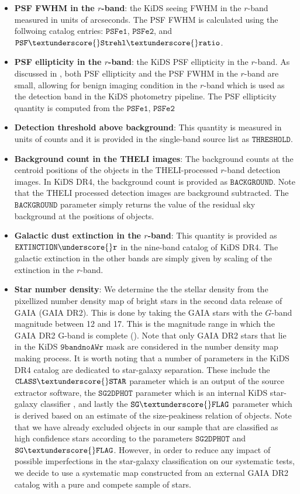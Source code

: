 \documentclass[fleqn,usenatbib,useAMS]{mnras}
\begin{document}
\begin{itemize}
  \item \textbf{PSF FWHM in the $r$-band}: the KiDS seeing FWHM in the $r$-band measured in units of arcseconds. The PSF FWHM is calculated using the follwoing catalog entries: $\mathtt{PSFe1}$, $\mathtt{PSFe2}$, and $\mathtt{PSF \textunderscore{} Strehl \textunderscore{} ratio}$.
    \item \textbf{PSF ellipticity in the $r$-band}: the KiDS PSF ellipticity in the $r$-band. As discussed in \citet{kuijken2019}, both PSF ellipticity and the PSF FWHM in the $r$-band are small, allowing for benign imaging condition in the $r$-band which is used as the detection band in the KiDS photometry pipeline. 
    The PSF ellipticity quantity is computed from the $\mathtt{PSFe1}$, $\mathtt{PSFe2}$
  \item \textbf{Detection threshold above background}: This quantity is measured in units of counts and it is provided in the single-band source list as $\mathtt{THRESHOLD}$. 
  \item \textbf{Background count in the THELI images}: The background counts at the centroid positions of the objects in the THELI-processed $r$-band detection images. In KiDS DR4, the background count is provided as $\mathtt{BACKGROUND}$. Note that the THELI processed detection images are background subtracted. The $\mathtt{BACKGROUND}$ parameter simply returns the value of the residual sky background at the positions of 
  objects.
  \item \textbf{Galactic dust extinction in the $r$-band}: This quantity is provided as $\mathtt{EXTINCTION\underscore{}r}$ in the nine-band catalog of KiDS DR4. The galactic extinction in the other bands are simply given by scaling of the extinction in the $r$-band.   
  \item \textbf{Star number density}: We determine the the stellar density from the pixellized number density map of bright stars in the second data release of GAIA (GAIA DR2). This is done by taking the GAIA stars with the $G$-band magnitude between 12 and 17. This is the magnitude range in which the GAIA DR2 G-band is complete (\citealt{gaia0,gaia1}). Note that only GAIA DR2 stars that lie in the KiDS $\mathtt{9bandnoAWr}$ mask are considered in the number density map making process. It is worth noting that a number of parameters in the KiDS DR4 catalog are dedicated to star-galaxy separation. These include the $\mathtt{CLASS\textunderscore{}STAR}$
 parameter which is an output of the source extractor software, the $\mathtt{SG2DPHOT}$ parameter which is an internal KiDS star-galaxy classifier \citep[e.g.][]{kids_dr3, radovich2017}, and lastly the $\mathtt{SG\textunderscore{}FLAG}$ parameter which is derived based on an estimate of the size-peakiness relation of objects. Note that we have already excluded objects in our sample that are classified as high confidence stars according to the parameters $\mathtt{SG2DPHOT}$ and $\mathtt{SG\textunderscore{} FLAG}$. However, in order to reduce any impact of possible imperfections in the star-galaxy classification on our systematic tests, we decide to use a systematic map constructed from an external GAIA DR2 catalog with a pure and compete sample of stars. 
 
\end{itemize}
\end{document}
